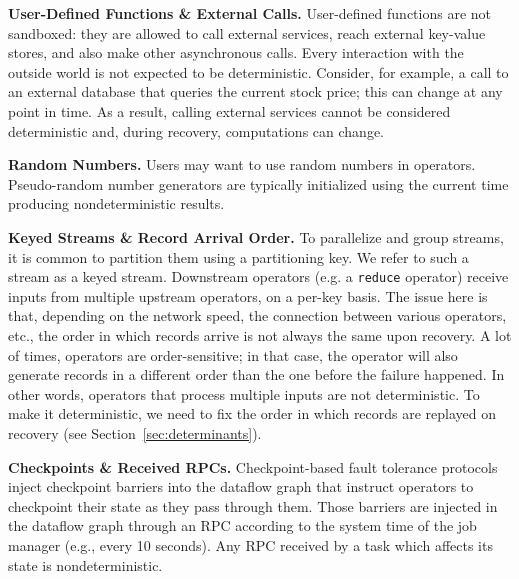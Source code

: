 \documentclass[sigconf]{acmart}
\newcommand{\para}[1]{\vspace{1mm}\noindent\textbf{#1.}}
\begin{document}
\para{User-Defined Functions \& External Calls} User-defined functions are not sandboxed: they are allowed to call external services, reach external key-value stores, and also make other asynchronous calls. Every interaction with the outside world is not expected to be deterministic. Consider, for example, a call to an external database that queries the current stock price; this can change at any point in time. As a result, calling external services cannot be considered deterministic and, during recovery, computations can change. 

\para{Random Numbers} Users may want to use random numbers in operators. Pseudo-random number generators are typically initialized using the current time producing nondeterministic results.

\para{Keyed Streams \& Record Arrival Order} To parallelize and group streams, it is common to partition them using a partitioning key. We refer to such a stream as a keyed stream. 
Downstream operators (e.g. a \texttt{reduce} operator) receive inputs from multiple upstream operators, on a per-key basis. The issue here is that, depending on the network speed, the connection between various operators, etc., the order in which records arrive is not always the same upon recovery. A lot of times, operators are order-sensitive; in that case, the operator will also generate records in a different order than the one before the failure happened. In other words, operators that process multiple inputs are not deterministic. To make it deterministic, we need to fix the order in which records are replayed on recovery (see Section~\ref{sec:determinants}).






\para{Checkpoints \& Received RPCs} Checkpoint-based fault tolerance protocols inject checkpoint barriers into the dataflow graph that instruct operators to checkpoint their state as they pass through them.
Those barriers are injected in the dataflow graph through an RPC according to the system time of the job manager (e.g., every 10 seconds). Any RPC received by a task which affects its state is nondeterministic.
\end{document}
